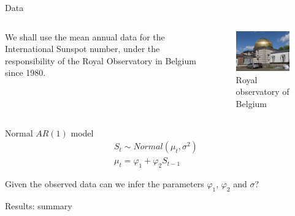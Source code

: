 \documentclass[aspectratio=169]{beamer}
\begin{document}
\begin{frame}{Data}
  \begin{columns}
    \begin{column}{0.5\textwidth}
      We shall use the mean annual data for the International Sunspot number,
      under the responsibility of the Royal Observatory in Belgium since 1980.
    \end{column}
    \begin{column}{0.5\textwidth}
      \vspace{1em}
      \begin{figure}
        \includegraphics[width=\textwidth]{belgium.JPG}
        \caption{Royal observatory of Belgium}
      \end{figure}
    \end{column}
  \end{columns}
\end{frame}

\begin{frame}{Normal $AR(1)$ model}
  \begin{align*}
    S_{t} \sim Normal(\mu_t, \sigma^2) &\\
	  \mu_t = \varphi_1 + \varphi_2 S_{t-1} &
  \end{align*}

  Given the observed data can we infer the parameters $\varphi_1$,
  $\varphi_2$ and $\sigma$?
\end{frame}

\begin{frame}{Results: summary}
  \centering
  \begin{table}
    
    \caption{Summary of posterior samples after running Stan for $10\,000$ iterations (3 seconds).}
  \end{table}
\end{frame}
\end{document}
